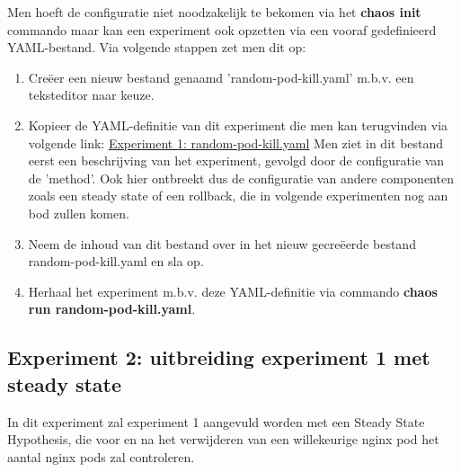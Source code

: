 Men hoeft de configuratie niet noodzakelijk te bekomen via het {\bf chaos init} commando maar kan een experiment ook opzetten via een vooraf gedefinieerd YAML-bestand. Via volgende stappen zet men dit op: 
\begin{enumerate} 
    \item Creëer een nieuw bestand genaamd 'random-pod-kill.yaml' m.b.v. een teksteditor naar keuze. 
    \item Kopieer de YAML-definitie van dit experiment die men kan terugvinden via volgende link: \href{https://github.com/KenBruggeman/BP\textunderscore 21-22/blob/master/bachelorproef/docs/chaostoolkit%20experimenten/random-pod-kill.yaml}{Experiment 1: random-pod-kill.yaml}
    \newline Men ziet in dit bestand eerst een beschrijving van het experiment, gevolgd door de configuratie van de 'method'. Ook hier ontbreekt dus de configuratie van andere componenten zoals een steady state of een rollback, die in volgende experimenten nog aan bod zullen komen.
    \item Neem de inhoud van dit bestand over in het nieuw gecreëerde bestand random-pod-kill.yaml en sla op.
    \item Herhaal het experiment m.b.v. deze YAML-definitie via commando {\bf chaos run random-pod-kill.yaml}.
\end{enumerate}

\subsection{Experiment 2: uitbreiding experiment 1 met steady state}

In dit experiment zal experiment 1 aangevuld worden met een Steady State Hypothesis, die voor en na het verwijderen van een willekeurige nginx pod het aantal nginx pods zal controleren.

